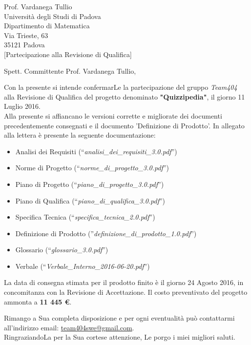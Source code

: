 \documentclass[boldsubject,shortindent,a4paper,11pt]{letteracdp}
\date{1 Luglio 2016}
\begin{document}
\begin{letter}{	Prof. Vardanega Tullio \\
				Universit\`a degli Studi di Padova \\
				Dipartimento di Matematica \\
				Via Trieste, 63 \\
				35121 Padova\\
				}
[Partecipazione alla Revisione di Qualifica]
\opening{Spett. Committente Prof. Vardanega Tullio,}
\noindent
Con la presente si intende confermarLe la partecipazione del gruppo \emph{Team404} alla Revisione di Qualifica del progetto denominato \textbf{"Quizzipedia"}, il giorno 11 Luglio 2016.
\\
\noindent
Alla presente si affiancano le versioni corrette e migliorate dei documenti precedentemente consegnati e il documento 'Definizione di Prodotto'.
\newline
\noindent
In allegato alla lettera è presente la seguente documentazione:
\begin{itemize}
	\item Analisi dei Requisiti (``\textit{analisi\_dei\_requisiti\_3.0.pdf}'')
	\item Norme di Progetto (``\textit{norme\_di\_progetto\_3.0.pdf}'')
	\item Piano di Progetto (``\textit{piano\_di\_progetto\_3.0.pdf}'')
	\item Piano di Qualifica (``\textit{piano\_di\_qualifica\_3.0.pdf}'')
	\item Specifica Tecnica (``\textit{specifica\_tecnica\_2.0.pdf}'')
	\item Definizione di Prodotto (''\textit{definizione\_di\_prodotto\_1.0.pdf}'')
	\item Glossario (``\textit{glossario\_3.0.pdf}'')
	\item Verbale (``\textit{Verbale\_Interno\_2016-06-20.pdf}'')
\end{itemize}

\noindent

La data di consegna stimata per il prodotto finito è il giorno 24 Agosto 2016, in concomitanza con la Revisione di Accettazione. 
Il costo preventivato del progetto ammonta a \textbf{11 445 \euro}.

\closing{Rimango a Sua completa disposizione e per ogni eventualit\`a pu\`o contattarmi all'indirizzo email: \url{team404swe@gmail.com}.\\RingraziandoLa per la Sua cortese attenzione, Le porgo i miei migliori saluti.}
\end{letter}
\end{document}

